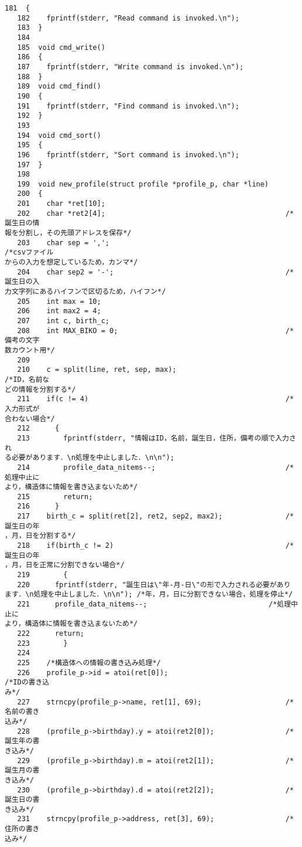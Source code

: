 \begin{Verbatim}[fontsize=\small, baselinestretch=0.8]
   181	{
   182	  fprintf(stderr, "Read command is invoked.\n");
   183	}
   184	
   185	void cmd_write()
   186	{
   187	  fprintf(stderr, "Write command is invoked.\n");
   188	}
   189	void cmd_find()
   190	{
   191	  fprintf(stderr, "Find command is invoked.\n");
   192	}
   193	
   194	void cmd_sort()
   195	{
   196	  fprintf(stderr, "Sort command is invoked.\n");
   197	}
   198	
   199	void new_profile(struct profile *profile_p, char *line)
   200	{
   201	  char *ret[10];
   202	  char *ret2[4];                                           /*誕生日の情
報を分割し，その先頭アドレスを保存*/
   203	  char sep = ',';                                          /*csvファイル
からの入力を想定しているため，カンマ*/
   204	  char sep2 = '-';                                         /*誕生日の入
力文字列にあるハイフンで区切るため，ハイフン*/
   205	  int max = 10;
   206	  int max2 = 4;
   207	  int c, birth_c;
   208	  int MAX_BIKO = 0;                                        /*備考の文字
数カウント用*/
   209	  
   210	  c = split(line, ret, sep, max);                          /*ID，名前な
どの情報を分割する*/
   211	  if(c != 4)                                               /*入力形式が
合わない場合*/
   212	    {
   213	      fprintf(stderr, "情報はID，名前，誕生日，住所，備考の順で入力され
る必要があります．\n処理を中止しました．\n\n");
   214	      profile_data_nitems--;                               /*処理中止に
より，構造体に情報を書き込まないため*/
   215	      return;
   216	    }
   217	  birth_c = split(ret[2], ret2, sep2, max2);               /*誕生日の年
，月，日を分割する*/
   218	  if(birth_c != 2)                                         /*誕生日の年
，月，日を正常に分割できない場合*/
   219	      {
   220		fprintf(stderr, "誕生日は\"年-月-日\"の形で入力される必要があり
ます．\n処理を中止しました．\n\n"); /*年，月，日に分割できない場合，処理を停止*/
   221		profile_data_nitems--;                             /*処理中止に
より，構造体に情報を書き込まないため*/
   222		return;
   223	      }
   224	
   225	  /*構造体への情報の書き込み処理*/
   226	  profile_p->id = atoi(ret[0]);                            /*IDの書き込
み*/
   227	  strncpy(profile_p->name, ret[1], 69);                    /*名前の書き
込み*/
   228	  (profile_p->birthday).y = atoi(ret2[0]);                 /*誕生年の書
き込み*/
   229	  (profile_p->birthday).m = atoi(ret2[1]);                 /*誕生月の書
き込み*/
   230	  (profile_p->birthday).d = atoi(ret2[2]);                 /*誕生日の書
き込み*/
   231	  strncpy(profile_p->address, ret[3], 69);                 /*住所の書き
込み*/

\end{Verbatim}
